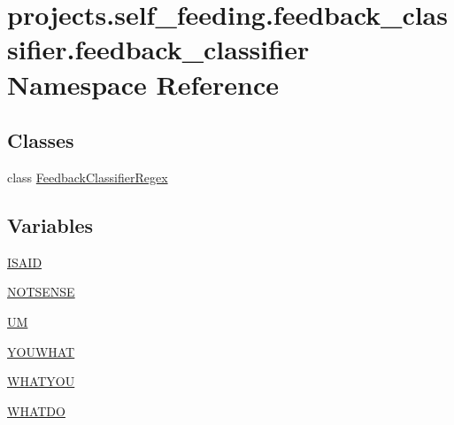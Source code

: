 \hypertarget{namespaceprojects_1_1self__feeding_1_1feedback__classifier_1_1feedback__classifier}{}\section{projects.\+self\+\_\+feeding.\+feedback\+\_\+classifier.\+feedback\+\_\+classifier Namespace Reference}
\label{namespaceprojects_1_1self__feeding_1_1feedback__classifier_1_1feedback__classifier}
\subsection*{Classes}
\begin{DoxyCompactItemize}
\item 
class \hyperlink{classprojects_1_1self__feeding_1_1feedback__classifier_1_1feedback__classifier_1_1FeedbackClassifierRegex}{Feedback\+Classifier\+Regex}
\end{DoxyCompactItemize}
\subsection*{Variables}
\begin{DoxyCompactItemize}
\item 
\hyperlink{namespaceprojects_1_1self__feeding_1_1feedback__classifier_1_1feedback__classifier_af2ef105e9e587e7d34b6384c61037247}{I\+S\+A\+ID}
\item 
\hyperlink{namespaceprojects_1_1self__feeding_1_1feedback__classifier_1_1feedback__classifier_ab08acaf23bca3a853842fbe8ab0e0a80}{N\+O\+T\+S\+E\+N\+SE}
\item 
\hyperlink{namespaceprojects_1_1self__feeding_1_1feedback__classifier_1_1feedback__classifier_aa8edddd038b9efb2f1e201657089a37a}{UM}
\item 
\hyperlink{namespaceprojects_1_1self__feeding_1_1feedback__classifier_1_1feedback__classifier_a441f044c1a501131511a7b32f85f288f}{Y\+O\+U\+W\+H\+AT}
\item 
\hyperlink{namespaceprojects_1_1self__feeding_1_1feedback__classifier_1_1feedback__classifier_ad9d87ebfd95f09b26d6c5ab7e4999c64}{W\+H\+A\+T\+Y\+OU}
\item 
\hyperlink{namespaceprojects_1_1self__feeding_1_1feedback__classifier_1_1feedback__classifier_a7d3ef0b97f5de0113e045ac488dcb782}{W\+H\+A\+T\+DO}
\end{DoxyCompactItemize}



